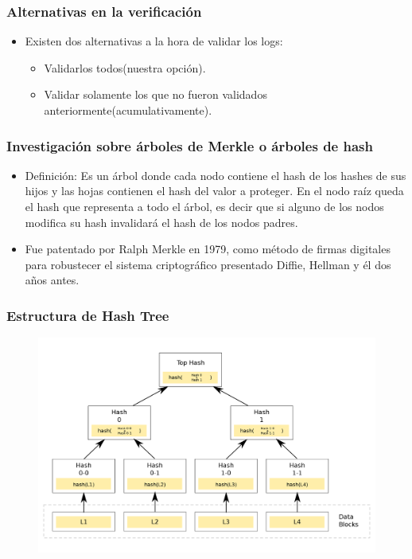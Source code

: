 \documentclass[10pt, a4paper,english,spanish]{beamer}
\begin{document}
\begin{frame}
\frametitle{Alternativas en la verificación}
\begin{itemize}
\item Existen dos alternativas a la hora de validar los logs:
\begin{itemize}
\item Validarlos todos(nuestra opción).
\item Validar solamente los que no fueron validados anteriormente(acumulativamente).
\end{itemize}
\end{itemize}
\end{frame}


\begin{frame}
\frametitle{Investigaci\'on sobre \'arboles de Merkle o \'arboles de hash}
\begin{itemize}

\item Definici\'on: Es un \'arbol donde cada nodo contiene el hash de los hashes de sus hijos y las hojas contienen el hash del valor a proteger. En el nodo ra\'iz queda el hash que representa a todo el \'arbol, es decir que si alguno de los nodos modifica su hash invalidar\'a el hash de los nodos padres.
\item Fue patentado por Ralph Merkle en 1979, como m\'etodo de firmas digitales para robustecer el sistema criptogr\'afico presentado Diffie, Hellman y \'el dos a\~nos antes.

\end{itemize}
\end{frame}


\begin{frame}
\frametitle{Estructura de Hash Tree}

\begin{figure}
  \includegraphics[width=\linewidth]{imagenes/hash_tree.png}
\end{figure}

\end{frame}
\end{document}
